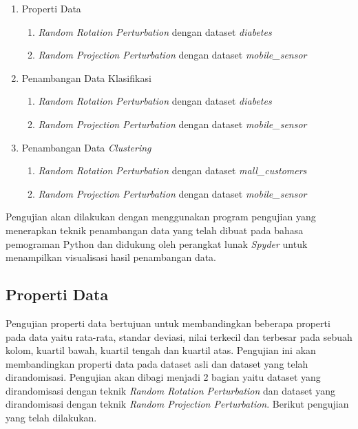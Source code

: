 \begin{enumerate}
	\item Properti Data
	\begin{enumerate}
		\item \textit{Random Rotation Perturbation} dengan dataset \textit{diabetes}
		\item \textit{Random Projection Perturbation} dengan dataset \textit{mobile\_sensor}
	\end{enumerate}
	\item Penambangan Data Klasifikasi
	\begin{enumerate}
		\item \textit{Random Rotation Perturbation} dengan dataset \textit{diabetes}
		\item \textit{Random Projection Perturbation} dengan dataset \textit{mobile\_sensor}
	\end{enumerate}
	\item Penambangan Data \textit{Clustering}
	\begin{enumerate}
		\item \textit{Random Rotation Perturbation} dengan dataset \textit{mall\_customers}
		\item \textit{Random Projection Perturbation} dengan dataset \textit{mobile\_sensor}
	\end{enumerate}
\end{enumerate}

Pengujian akan dilakukan dengan menggunakan program pengujian yang menerapkan teknik penambangan data yang telah dibuat pada bahasa pemograman Python dan didukung oleh perangkat lunak \textit{Spyder} untuk menampilkan visualisasi hasil penambangan data.

\subsection{Properti Data}
\label{subsec:pengujian-properti}

Pengujian properti data bertujuan untuk membandingkan beberapa properti pada data yaitu rata-rata, standar deviasi, nilai terkecil dan terbesar pada sebuah kolom, kuartil bawah, kuartil tengah dan kuartil atas. Pengujian ini akan membandingkan properti data pada dataset asli dan dataset yang telah dirandomisasi. Pengujian akan dibagi menjadi 2 bagian yaitu dataset yang dirandomisasi dengan teknik \textit{Random Rotation Perturbation} dan dataset yang dirandomisasi dengan teknik \textit{Random Projection Perturbation}. Berikut pengujian yang telah dilakukan.

